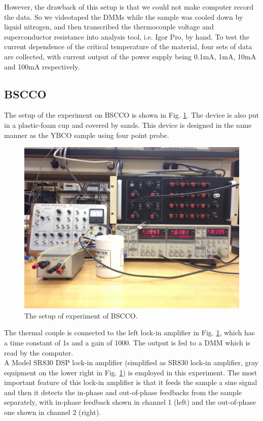 \documentclass[prb,preprint]{revtex4-1}
\begin{document}
However, the drawback of this setup is that we could not make computer record the data. So we videotaped the DMMs while the sample was cooled down by liquid nitrogen, and then transcribed the thermocouple voltage and superconductor resistance into analysis tool, i.e. Igor Pro, by hand. To test the current dependence of the critical temperature of the material, four sets of data are collected, with current output of the power supply being 0.1mA, 1mA, 10mA and 100mA respectively.\\

\subsection{BSCCO}

The setup of the experiment on BSCCO is shown in Fig. \ref{bsccosetup}. The device is also put in a plastic-foam cup and covered by sands. This device is designed in the same manner as the YBCO sample using four point probe.

\begin{figure}[h]
\centering
\includegraphics[width=14cm]{bsccosetup.jpg}
\caption{The setup of experiment of BSCCO.}
\label{bsccosetup}
\end{figure}

The thermal couple is connected to the left lock-in amplifier in Fig. \ref{bsccosetup}, which has a time constant of 1s and a gain of 1000. The output is fed to a DMM which is read by the computer. \\

A Model SR830 DSP lock-in amplifier (simplified as SR830 lock-in amplifier, gray equipment on the lower right in Fig. \ref{bsccosetup}) is employed in this experiment. The most important feature of this lock-in amplifier is that it feeds the sample a sine signal and then it detects the in-phase and out-of-phase feedbacks from the sample separately, with in-phase feedback shown in channel 1 (left) and the out-of-phase one shown in channel 2 (right). \\
\end{document}
